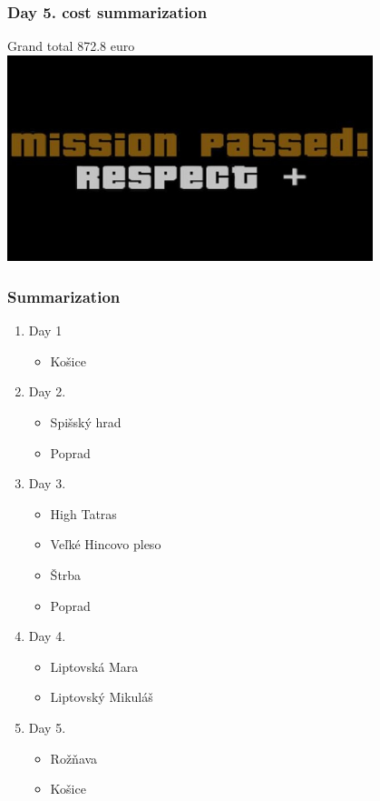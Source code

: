 \documentclass{beamer}
\begin{document}
	\begin{frame}
		\frametitle{Day 5. cost summarization}

		\centering
		Grand total 872.8 euro\\[1em]
		
		\pause
		\includegraphics[width=0.8\textwidth]{mission}
	\end{frame}	
	

	\begin{frame}
		\frametitle{Summarization}
		\begin{enumerate}
			\item Day 1
				\begin{itemize}
					\item Košice
				\end{itemize}
			\item Day 2.
				\begin{itemize}
					\item Spišský hrad
					\item Poprad
				\end{itemize}
			\item Day 3.
				\begin{itemize}
					\item High Tatras
					\item Veľké Hincovo pleso
					\item Štrba
					\item Poprad
				\end{itemize}
			\item Day 4.
				\begin{itemize}
					\item Liptovská Mara
					\item Liptovský Mikuláš
				\end{itemize}
			\item Day 5.
				\begin{itemize}
					\item Rožňava
					\item Košice
				\end{itemize}
		\end{enumerate}
	\end{frame}
\end{document}

